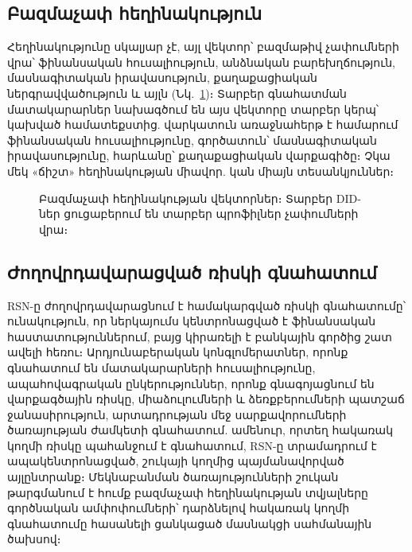 \documentclass[11pt,a4paper,twocolumn]{article}
\begin{document}
\subsection{Բազմաչափ հեղինակություն}

Հեղինակությունը սկալյար չէ, այլ վեկտոր՝ բազմաթիվ չափումների վրա՝ ֆինանսական հուսալիություն, անձնական բարեխղճություն, մասնագիտական իրավասություն, քաղաքացիական ներգրավվածություն և այլն (Նկ.~\ref{fig:reputation-radar})։ Տարբեր գնահատման մատակարարներ նախագծում են այս վեկտորը տարբեր կերպ՝ կախված համատեքստից. վարկատուն առաջնահերթ է համարում ֆինանսական հուսալիությունը, գործատուն՝ մասնագիտական իրավասությունը, հարևանը՝ քաղաքացիական վարքագիծը։ Չկա մեկ «ճիշտ» հեղինակության միավոր. կան միայն տեսանկյուններ։

\begin{figure}[ht]
\centering
{}
\caption{Բազմաչափ հեղինակության վեկտորներ։ Տարբեր DID-ներ ցուցաբերում են տարբեր պրոֆիլներ չափումների վրա։}
\label{fig:reputation-radar}
\end{figure}

\subsection{Ժողովրդավարացված ռիսկի գնահատում}

RSN-ը ժողովրդավարացնում է համակարգված ռիսկի գնահատումը՝ ունակություն, որ ներկայումս կենտրոնացված է ֆինանսական հաստատություններում, բայց կիրառելի է բանկային գործից շատ ավելի հեռու։ Արդյունաբերական կոնգլոմերատներ, որոնք գնահատում են մատակարարների հուսալիությունը, ապահովագրական ընկերություններ, որոնք գնագոյացնում են վարքագծային ռիսկը, միաձուլումների և ձեռքբերումների պատշաճ ջանասիրություն, արտադրության մեջ սարքավորումների ծառայության ժամկետի գնահատում. ամենուր, որտեղ հակառակ կողմի ռիսկը պահանջում է գնահատում, RSN-ը տրամադրում է ապակենտրոնացված, շուկայի կողմից պայմանավորված այլընտրանք։ Մեկնաբանման ծառայությունների շուկան թարգմանում է հումք բազմաչափ հեղինակության տվյալները գործնական ամփոփումների՝ դարձնելով հակառակ կողմի գնահատումը հասանելի ցանկացած մասնակցի սահմանային ծախսով։
\end{document}
